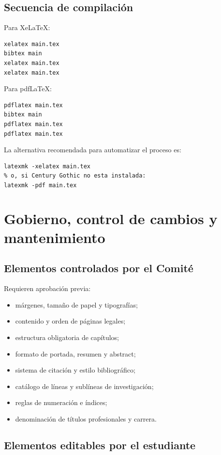 \documentclass[12pt,a4paper,oneside]{report}
\begin{document}
\section{Secuencia de compilación}

Para XeLaTeX:

\begin{lstlisting}
xelatex main.tex
bibtex main
xelatex main.tex
xelatex main.tex
\end{lstlisting}

Para pdfLaTeX:

\begin{lstlisting}
pdflatex main.tex
bibtex main
pdflatex main.tex
pdflatex main.tex
\end{lstlisting}

La alternativa recomendada para automatizar el proceso es:

\begin{lstlisting}
latexmk -xelatex main.tex
% o, si Century Gothic no esta instalada:
latexmk -pdf main.tex
\end{lstlisting}

\chapter{Gobierno, control de cambios y mantenimiento}

\section{Elementos controlados por el Comité}

Requieren aprobación previa:

\begin{itemize}
  \item márgenes, tamaño de papel y tipografías;
  \item contenido y orden de páginas legales;
  \item estructura obligatoria de capítulos;
  \item formato de portada, resumen y abstract;
  \item sistema de citación y estilo bibliográfico;
  \item catálogo de líneas y sublíneas de investigación;
  \item reglas de numeración e índices;
  \item denominación de títulos profesionales y carrera.
\end{itemize}

\section{Elementos editables por el estudiante}
\end{document}
